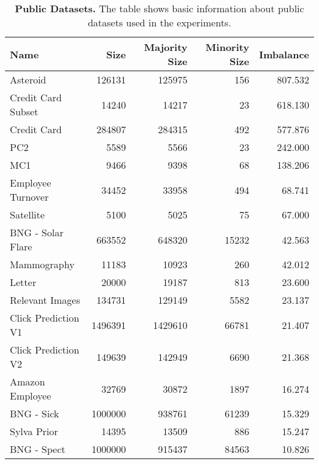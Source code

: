 \begin{table}
    \centering

    \begin{tabular}{lrrrr}
        \toprule
        Name & Size & Majority Size & Minority Size & Imbalance \\
        \midrule
        Asteroid & 126131 & 125975 & 156 & 807.532 \\
        Credit Card Subset & 14240 & 14217 & 23 & 618.130 \\
        Credit Card & 284807 & 284315 & 492 & 577.876 \\
        PC2 & 5589 & 5566 & 23 & 242.000 \\
        MC1 & 9466 & 9398 & 68 & 138.206 \\
        Employee Turnover & 34452 & 33958 & 494 & 68.741 \\
        Satellite & 5100 & 5025 & 75 & 67.000 \\
        BNG - Solar Flare & 663552 & 648320 & 15232 & 42.563 \\
        Mammography & 11183 & 10923 & 260 & 42.012 \\
        Letter & 20000 & 19187 & 813 & 23.600 \\
        Relevant Images & 134731 & 129149 & 5582 & 23.137 \\
        Click Prediction V1 & 1496391 & 1429610 & 66781 & 21.407 \\
        Click Prediction V2 & 149639 & 142949 & 6690 & 21.368 \\
        Amazon Employee & 32769 & 30872 & 1897 & 16.274 \\
        BNG - Sick & 1000000 & 938761 & 61239 & 15.329 \\
        Sylva Prior & 14395 & 13509 & 886 & 15.247 \\
        BNG - Spect & 1000000 & 915437 & 84563 & 10.826 \\
        \bottomrule
    \end{tabular}

    \caption{
        \textbf{Public Datasets.} The table shows basic information about public datasets used in
        the experiments.
    }
    \label{table:datasets}
\end{table}
